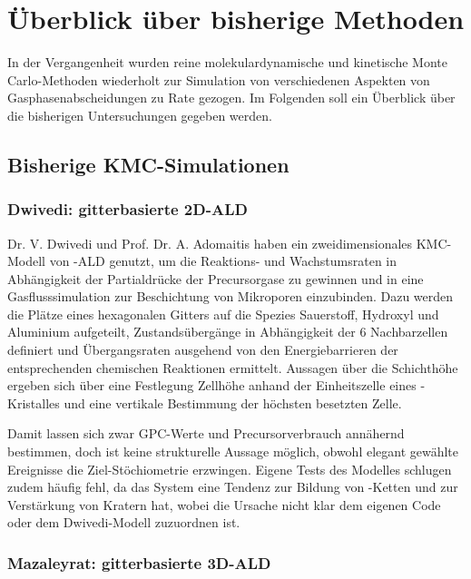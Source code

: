 \section{Überblick über bisherige Methoden}

In der Vergangenheit wurden reine molekulardynamische und kinetische Monte Carlo-Methoden wiederholt zur Simulation von verschiedenen Aspekten von Gasphasenabscheidungen zu Rate gezogen.
Im Folgenden soll ein Überblick über die bisherigen Untersuchungen gegeben werden.

\subsection{Bisherige KMC-Simulationen}

\subsubsection{Dwivedi: gitterbasierte 2D-ALD}

Dr. V. Dwivedi und Prof. Dr. A. Adomaitis \cite{dwivedi_multiscale_2009}\cite{dwivedi_multiscale_2009-1}\cite{dwivedi_multiscale_2010} haben ein zweidimensionales KMC-Modell von -ALD genutzt, um die Reaktions- und Wachstumsraten in Abhängigkeit der Partialdrücke der Precursorgase zu gewinnen und in eine Gasflusssimulation zur Beschichtung von Mikroporen einzubinden.
Dazu werden die Plätze eines hexagonalen Gitters auf die Spezies Sauerstoff, Hydroxyl und Aluminium aufgeteilt, Zustandsübergänge in Abhängigkeit der 6 Nachbarzellen definiert und Übergangsraten ausgehend von den Energiebarrieren der entsprechenden chemischen Reaktionen ermittelt.
Aussagen über die Schichthöhe ergeben sich über eine Festlegung Zellhöhe anhand der Einheitszelle eines -Kristalles und eine vertikale Bestimmung der höchsten besetzten Zelle.

Damit lassen sich zwar GPC-Werte und Precursorverbrauch annähernd bestimmen, doch ist keine strukturelle Aussage möglich, obwohl elegant gewählte Ereignisse die Ziel-Stöchiometrie erzwingen.
Eigene Tests des Modelles schlugen zudem häufig fehl, da das System eine Tendenz zur Bildung von -Ketten und zur Verstärkung von Kratern hat, wobei die Ursache nicht klar dem eigenen Code oder dem Dwivedi-Modell zuzuordnen ist.

\subsubsection{Mazaleyrat: gitterbasierte 3D-ALD}


